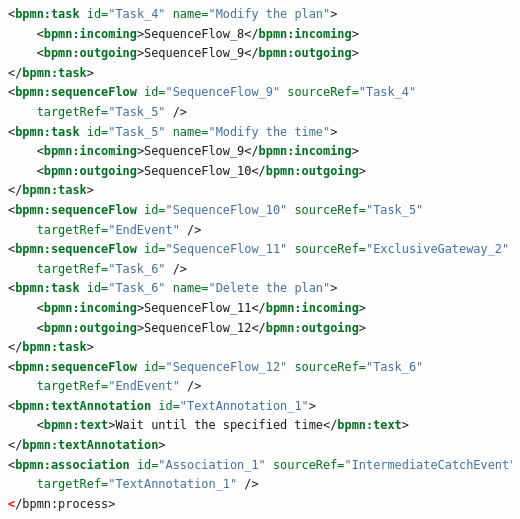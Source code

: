 \documentclass[runningheads]{llncs}
\begin{document}
\begin{lstlisting}[language={XML}]
<bpmn:task id="Task_4" name="Modify the plan">
    <bpmn:incoming>SequenceFlow_8</bpmn:incoming>
    <bpmn:outgoing>SequenceFlow_9</bpmn:outgoing>
</bpmn:task>
<bpmn:sequenceFlow id="SequenceFlow_9" sourceRef="Task_4"
    targetRef="Task_5" />
<bpmn:task id="Task_5" name="Modify the time">
    <bpmn:incoming>SequenceFlow_9</bpmn:incoming>
    <bpmn:outgoing>SequenceFlow_10</bpmn:outgoing>
</bpmn:task>
<bpmn:sequenceFlow id="SequenceFlow_10" sourceRef="Task_5"
    targetRef="EndEvent" />
<bpmn:sequenceFlow id="SequenceFlow_11" sourceRef="ExclusiveGateway_2"
    targetRef="Task_6" />
<bpmn:task id="Task_6" name="Delete the plan">
    <bpmn:incoming>SequenceFlow_11</bpmn:incoming>
    <bpmn:outgoing>SequenceFlow_12</bpmn:outgoing>
</bpmn:task>
<bpmn:sequenceFlow id="SequenceFlow_12" sourceRef="Task_6"
    targetRef="EndEvent" />
<bpmn:textAnnotation id="TextAnnotation_1">
    <bpmn:text>Wait until the specified time</bpmn:text>
</bpmn:textAnnotation>
<bpmn:association id="Association_1" sourceRef="IntermediateCatchEvent"
    targetRef="TextAnnotation_1" />
</bpmn:process>
	\end{lstlisting}
	
\end{document}
